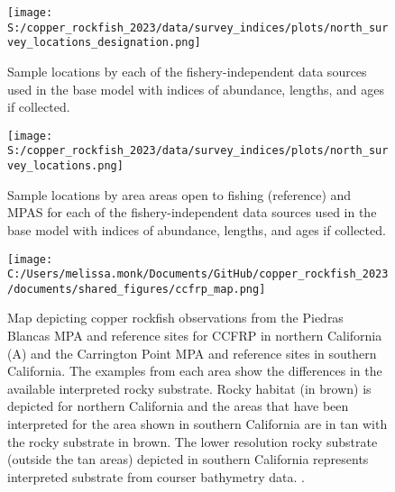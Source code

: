 \documentclass[11pt,
  letterpaper,
]{article}
\begin{document}
\pagebreak

\begin{figure}
{\centering
\texttt{[image: S:/copper\_rockfish\_2023/data/survey\_indices/plots/north\_survey\_locations\_designation.png]}
}
\caption{Sample locations by each of the fishery-independent data sources used in the base model with indices of abundance, lengths, and ages if collected.\label{fig:survey-locations}}
\end{figure}

\pagebreak

\begin{figure}
{\centering
\texttt{[image: S:/copper\_rockfish\_2023/data/survey\_indices/plots/north\_survey\_locations.png]}
}
\caption{Sample locations by area areas open to fishing (reference) and MPAS for each of the fishery-independent data sources used in the base model with indices of abundance, lengths, and ages if collected.\label{fig:ref-mpa}}
\end{figure}

\pagebreak

\begin{figure}
{\centering
\texttt{[image: C:/Users/melissa.monk/Documents/GitHub/copper\_rockfish\_2023/documents/shared\_figures/ccfrp\_map.png]}
}
\caption{Map depicting copper rockfish observations from the Piedras Blancas MPA and reference sites for CCFRP in northern California (A) and the Carrington Point MPA and reference sites in southern California. The examples from each area show the differences in the available interpreted rocky substrate. Rocky habitat (in brown) is depicted for northern California and the areas that have been interpreted for the area shown in southern California are in tan with the rocky substrate in brown.  The lower resolution rocky substrate (outside the tan areas) depicted in southern California represents interpreted substrate from courser bathymetry data. .\label{fig:ccfrp-map}}
\end{figure}
\end{document}
